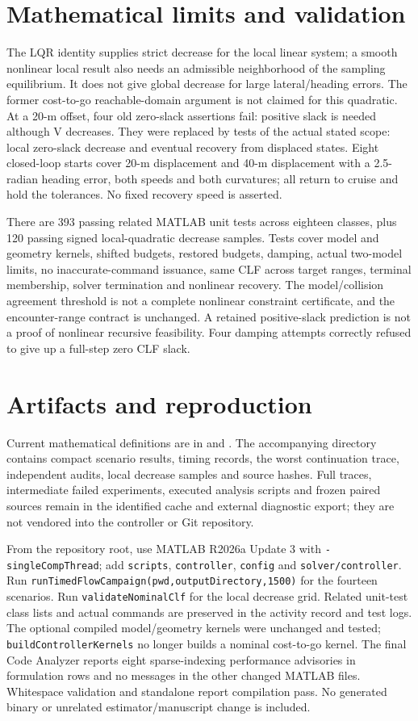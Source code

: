 \documentclass[10pt]{article}
\begin{document}
\section{Mathematical limits and validation}
The LQR identity supplies strict decrease for the local linear system; a smooth
nonlinear local result also needs an admissible neighborhood of the sampling
equilibrium. It does not give global decrease for large lateral/heading errors.
The former cost-to-go reachable-domain argument is not claimed for this quadratic.
At a 20-m offset, four old zero-slack assertions fail: positive slack is needed
although V decreases. They were replaced by tests of the actual stated scope:
local zero-slack decrease and eventual recovery from displaced states.
Eight closed-loop starts cover 20-m displacement and 40-m displacement with a
2.5-radian heading error, both speeds and both curvatures; all return to cruise
and hold the tolerances. No fixed recovery speed is asserted.

There are 393 passing related MATLAB unit tests across eighteen classes, plus
120 passing signed local-quadratic decrease samples. Tests cover model and
geometry kernels, shifted budgets, restored budgets, damping, actual two-model
limits, no inaccurate-command issuance, same CLF across target ranges, terminal
membership, solver termination and nonlinear recovery. The model/collision
agreement threshold is not a complete nonlinear constraint certificate, and the
encounter-range contract is unchanged. A retained positive-slack prediction is
not a proof of nonlinear recursive feasibility. Four damping attempts correctly
refused to give up a full-step zero CLF slack.

\section{Artifacts and reproduction}
Current mathematical definitions are in  and
. The accompanying
 directory contains compact scenario
results, timing records, the worst continuation trace, independent audits,
local decrease samples and source hashes. Full traces, intermediate failed
experiments, executed analysis scripts and frozen paired sources remain in the
identified cache and external diagnostic export; they are not vendored into the
controller or Git repository.

From the repository root, use MATLAB R2026a Update 3 with
\texttt{-singleCompThread}; add \texttt{scripts}, \texttt{controller},
\texttt{config} and \texttt{solver/controller}. Run
\texttt{runTimedFlowCampaign(pwd,outputDirectory,1500)} for the fourteen scenarios.
Run \texttt{validateNominalClf} for the local decrease grid. Related unit-test
class lists and actual commands are preserved in the activity record and test
logs. The optional compiled model/geometry kernels were unchanged and tested;
\texttt{buildControllerKernels} no longer builds a nominal cost-to-go kernel.
The final Code Analyzer reports eight sparse-indexing performance advisories in
formulation rows and no messages in the other changed MATLAB files. Whitespace
validation and standalone report compilation pass. No generated binary or
unrelated estimator/manuscript change is included.
\end{document}
